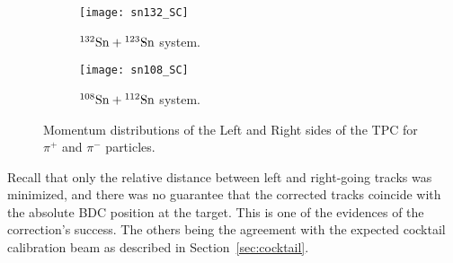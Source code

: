 \begin{comment}

\begin{figure}[!htb]
    \centering
    \begin{subfigure}[t]{0.49\textwidth}
        \centering
        \texttt{[image: BDC\_P\_frac\_small\_angle.pdf]} 
        \caption{Generic} \label{fig:mom_S_1D}
    \end{subfigure}
    \hfill
    \begin{subfigure}[t]{0.49\textwidth}
        \centering
        \texttt{[image: BDC\_P\_frac\_large\_angle.pdf]} 
        \caption{Competitors} \label{fig:mom_L_1D}
    \end{subfigure}
    
\label{fig:mom_1D}
\end{figure}
\end{comment}






\begin{figure}[!htb]
    \centering
    \begin{subfigure}[t]{\textwidth}
        \centering
        \texttt{[image: sn132\_SC]} 
        \caption{${}^{132}\mathrm{Sn} + {}^{123}\mathrm{Sn}$ system.} \label{fig:132momdist_sc}
    \end{subfigure}
   
    \begin{subfigure}[t]{\textwidth}
        \centering
        \texttt{[image: sn108\_SC]} 
        \caption{${}^{108}\mathrm{Sn} + {}^{112}\mathrm{Sn}$ system.} \label{fig:108momdist_sc}
    \end{subfigure}
\caption{Momentum distributions of the Left and Right sides of the TPC for $\pi^+$ and $\pi^-$ particles.}
\label{fig:sc_momdist}
\end{figure}



Recall that only the relative distance between left and right-going tracks was minimized, and there was no guarantee that the corrected tracks coincide with the absolute BDC position at the target. This is one of the evidences of the correction's success. The others being the agreement with the expected cocktail calibration beam as described in Section~\ref{sec:cocktail}.

